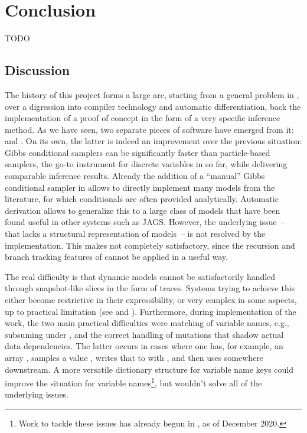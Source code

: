 \chapter{Conclusion}
\label{cha:conclusion}

TODO

\section{Discussion}
\label{sec:discussion}

The history of this project forms a large arc, starting from a general problem in \turingjl{}, over
a digression into compiler technology and automatic differentiation, back the implementation of a
proof of concept in the form of a very specific inference method.  As we have seen, two separate
pieces of software have emerged from it: \irtrackerjl{} and \autogibbsjl{}.  On its own, the latter
is indeed an improvement over the previous situation: Gibbs conditional samplers can be
significantly faster than particle-based samplers, the go-to instrument for discrete variables in
\turingjl{} so far, while delivering comparable inference results.  Already the addition of a
\enquote{manual} Gibbs conditional sampler in \turingjl{} allows to directly implement many models
from the literature, for which conditionals are often provided analytically.  Automatic derivation
allows to generalize this to a large class of models that have been found useful in other systems
such as JAGS.  However, the underlying issue~-- that \turingjl{} lacks a structural representation
of models~-- is not resolved by the implementation.  This makes \autogibbsjl{} not
completely satisfactory, since the recursion and branch tracking features of \irtrackerjl{} cannot
be applied in a useful way.

The real difficulty is that dynamic models cannot be satisfactorily handled through snapshot-like
slices in the form of traces.  Systems trying to achieve this either become restrictive in their
expressibility, or very complex in some aspects, up to practical limitation (see
\textcite{mansinghka2014venture} and \textcite{goodman2012church}).  Furthermore, during
implementation of the work, the two main practical difficulties were matching of variable names,
e.g., subsuming  under , and the correct handling of mutations that
shadow actual data dependencies.  The latter occurs in cases where one has, for example, an array
, samples a value , writes that to  with , and then
uses  somewhere downstream.  A more versatile dictionary structure for
variable name keys could improve the situation for variable names\footnote{Work to tackle these
  issues has already begun in \turingjl{}, as of December 2020.}, but wouldn't solve all of the
underlying issues.

